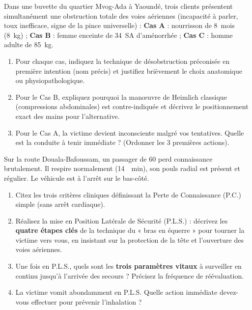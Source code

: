 \documentclass[11pt]{article}
\begin{document}
\begin{exercice}
Dans une buvette du quartier Mvog-Ada à Yaoundé, trois clients présentent simultanément une obstruction totale des voies aériennes (incapacité à parler, toux inefficace, signe de la pince universelle) : \textbf{Cas A} : nourrisson de 8~mois (\SI{8}{\kilogram}) ; \textbf{Cas B} : femme enceinte de 34~SA d'aménorrhée ; \textbf{Cas C} : homme adulte de \SI{85}{\kilogram}.
\begin{enumerate}
    \item Pour chaque cas, indiquez la technique de désobstruction préconisée en première intention (nom précis) et justifiez brièvement le choix anatomique ou physiopathologique.
    \item Pour le Cas B, expliquez pourquoi la manœuvre de Heimlich classique (compressions abdominales) est contre-indiquée et décrivez le positionnement exact des mains pour l'alternative.
    \item Pour le Cas A, la victime devient inconsciente malgré vos tentatives. Quelle est la conduite à tenir immédiate ? (Ordonner les 3 premières actions).
\end{enumerate}
\end{exercice}

\begin{exercice}
Sur la route Douala-Bafoussam, un passager de \SI{60}{} perd connaissance brutalement. Il respire normalement (\SI{14}{\per\minute}), son pouls radial est présent et régulier. Le véhicule est à l'arrêt sur le bas-côté.
\begin{enumerate}
    \item Citez les trois critères cliniques définissant la Perte de Connaissance (P.C.) simple (sans arrêt cardiaque).
    \item Réalisez la mise en Position Latérale de Sécurité (P.L.S.) : décrivez les \textbf{quatre étapes clés} de la technique du « bras en équerre » pour tourner la victime vers vous, en insistant sur la protection de la tête et l'ouverture des voies aériennes.
    \item Une fois en P.L.S., quels sont les \textbf{trois paramètres vitaux} à surveiller en continu jusqu'à l'arrivée des secours ? Précisez la fréquence de réévaluation.
    \item La victime vomit abondamment en P.L.S. Quelle action immédiate devez-vous effectuer pour prévenir l'inhalation ?
\end{enumerate}
\end{exercice}
\end{document}
